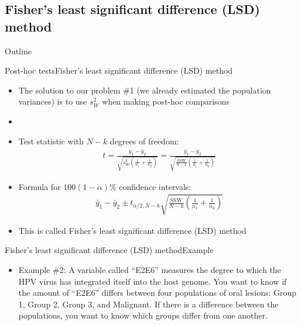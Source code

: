 \documentclass[xcolor=dvipsnames]{beamer}
\begin{document}
\subsection{Fisher's least significant difference (LSD) method}

\begin{frame}{Outline}
	\tableofcontents[currentsection,subsectionstyle=show/shaded/hide]
\end{frame}

\begin{frame}{Post-hoc tests}{Fisher's least significant difference (LSD) method}
	\begin{itemize}
		\item The solution to our problem \#1 (we already estimated the population variances) is to use $s^2_W$ when making post-hoc comparisons \pause
		\item[]
		\item Test statistic with $N-k$ degrees of freedom:\pause
		\begin{gather*}
			t = \frac{\bar{y}_1 - \bar{y}_2}{\sqrt{s^2_W\left(\frac{1}{n_1}+\frac{1}{n_2}\right)}} = \frac{\bar{y}_1 - \bar{y}_2}{\sqrt{\frac{\text{SSW}}{N-k} \left(\frac{1}{n_1}+\frac{1}{n_2}\right)}}
		\end{gather*} \pause
		\item Formula for $100(1-\alpha)\%$ confidence intervals:\pause
		\begin{gather*}
			\bar{y}_1 - \bar{y}_2 \pm t_{\alpha / 2, N - k}{\sqrt{\frac{\text{SSW}}{N-k} \left(\frac{1}{n_1}+\frac{1}{n_2}\right)}}
		\end{gather*}\pause
		\item This is called Fisher's least significant difference (LSD) method
	\end{itemize}
\end{frame}

\begin{frame}{Fisher's least significant difference (LSD) method}{Example}
	\begin{itemize}
		\item Example \#2: A variable called ``E2E6'' measures the degree to which the HPV virus has integrated itself into the host genome. You want to know if the amount of ``E2E6'' differs between four populations of oral lesions: Group 1, Group 2, Group 3, and Malignant. If there is a difference between the populations, you want to know which groups differ from one another.
	\end{itemize}
\end{frame}      
\end{document}
